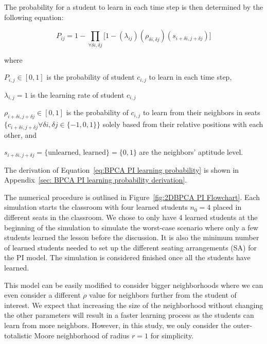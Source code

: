 The probability for a student to learn in each time step is then determined by the following equation:

\begin{equation}
    \label{eq:BPCA PI learning probability}
        P_{ij} = 1 - \prod_{\forall \delta i, \delta j}{\lbrack1-(\lambda_{ij})(\rho_{\delta i, \delta j})(s_{i+\delta i, j+\delta j})}\rbrack
\end{equation}

where

$P_{i,j} \in [0,1]$ is the probability of student $c_{i,j}$ to learn in each time step, 

$\lambda_{i,j} = 1$ is the learning rate of student $c_{i,j}$

$\rho_{i+\delta i, j+\delta j} \in [0,1]$ is the probability of $c_{i,j}$ to learn from their neighbors in seats $\lbrace c_{i+\delta i, j+\delta j} \forall \delta i, \delta j \in \lbrace -1,0,1 \rbrace \rbrace$ solely based from their relative positions with each other, and

$s_{i+\delta i, j+\delta j} = \lbrace\text{unlearned, learned}\rbrace=\lbrace 0,1 \rbrace$ are the neighbors' aptitude level.

The derivation of Equation~\ref{eq:BPCA PI learning probability} is shown in Appendix~\ref{sec: BPCA PI learning probability derivation}.

The numerical procedure is outlined in Figure~\ref{fig:2DBPCA PI Flowchart}. 
Each simulation starts the classroom with four learned students $n_0 = 4$ placed in different seats in the classroom.
We chose to only have 4 learned students at the beginning of the simulation to simulate the worst-case scenario where only a few students learned the lesson before the discussion.
It is also the minimum number of learned students needed to set up the different seating arrangements (SA) for the PI model.
The simulation is considered finished once all the students have learned.

This model can be easily modified to consider bigger neighborhoods where we can even consider a different $\rho$ value for neighbors further from the student of interest.
We expect that increasing the size of the neighborhood without changing the other parameters will result in a faster learning process as the students can learn from more neighbors.
However, in this study, we only consider the outer-totalistic Moore neighborhood of radius $r=1$ for simplicity.

